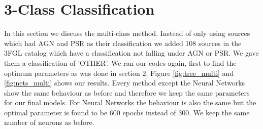 \section{3-Class Classification}
In this section we discuss the multi-class method\footnotemark{}. Instead of only using sources which had AGN and PSR as their classification we added 108 sources in the 3FGL catalog which have a classification not falling under AGN or PSR. We gave them a classification of 'OTHER'. We ran our codes again, first to find the optimum parameters as was done in section 2. Figure \ref{fig:tree_multi} and \ref{fig:nets_multi} shows our results. Every method except the Neural Networks show the same behaviour as before and therefore we keep the same parameters for our final models. For Neural Networks the behaviour is also the same but the optimal parameter is found to be 600 epochs instead of 300. We keep the same number of neurons as before.


